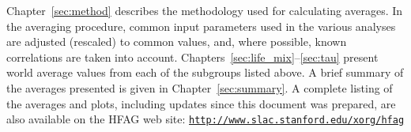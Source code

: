 Chapter~\ref{sec:method} describes the methodology used for calculating
averages. In the averaging procedure, common input parameters used in 
the various analyses are adjusted (rescaled) to common values, and, 
where possible, known correlations are taken into account. 
Chapters~\ref{sec:life_mix}--\ref{sec:tau} present world 
average values from each of the subgroups listed above. 
A brief 
summary of the averages presented is given in Chapter~\ref{sec:summary}.   
A complete listing of the averages and plots,
including updates since this document was prepared,
are also available on the HFAG web site:
\vskip0.15in\hskip0.75in
\vbox{
  \href{http://www.slac.stanford.edu/xorg/hfag}{\tt http://www.slac.stanford.edu/xorg/hfag} 
}


